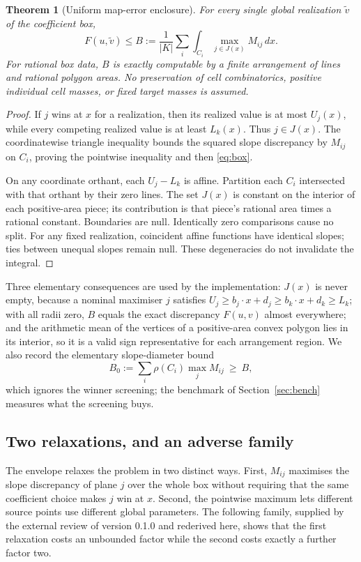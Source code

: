 \documentclass[11pt]{article}
\newtheorem{theorem}{Theorem}
\theoremstyle{remark}
\begin{document}
\begin{theorem}[Uniform map-error enclosure]\label{thm:box}
For every single global realization $\widetilde v$ of the coefficient box,
\begin{equation}\label{eq:box}
 F(u,\widetilde v)\leq
 B:=\frac1{|K|}\sum_i\int_{C_i}\max_{j\in J(x)}M_{ij}\,dx.
\end{equation}
For rational box data, $B$ is exactly computable by a finite arrangement of
lines and rational polygon areas. No preservation of cell combinatorics,
positive individual cell masses, or fixed target masses is assumed.
\end{theorem}
\begin{proof}
If $j$ wins at $x$ for a realization, then its realized value is at most
$U_j(x)$, while every competing realized value is at least $L_k(x)$.
Thus $j\in J(x)$. The coordinatewise triangle inequality bounds the
squared slope discrepancy by $M_{ij}$ on $C_i$, proving the pointwise
inequality and then \eqref{eq:box}.

On any coordinate orthant, each $U_j-L_k$ is affine. Partition each
$C_i$ intersected with that orthant by their zero lines. The set $J(x)$
is constant on the interior of each positive-area piece; its contribution
is that piece's rational area times a rational constant. Boundaries are
null. Identically zero comparisons cause no split. For any fixed
realization, coincident affine functions have identical slopes; ties
between unequal slopes remain null. These degeneracies do not invalidate
the integral.
\end{proof}

Three elementary consequences are used by the implementation: $J(x)$ is never
empty, because a nominal maximiser $j$ satisfies $U_j\ge b_j\cdot x+d_j\ge
b_k\cdot x+d_k\ge L_k$; with all radii zero, $B$ equals the exact discrepancy
$F(u,v)$ almost everywhere; and the arithmetic mean of the vertices of a
positive-area convex polygon lies in its interior, so it is a valid sign
representative for each arrangement region. We also record the elementary
slope-diameter bound
\begin{equation}\label{eq:baseline}
 B_0:=\sum_i\rho(C_i)\max_j M_{ij}\ \ge\ B,
\end{equation}
which ignores the winner screening; the benchmark of Section~\ref{sec:bench}
measures what the screening buys.

\subsection{Two relaxations, and an adverse family}
The envelope relaxes the problem in two distinct ways. First, $M_{ij}$
maximises the slope discrepancy of plane $j$ over the whole box without
requiring that the same coefficient choice makes $j$ win at $x$. Second, the
pointwise maximum lets different source points use different global
parameters. The following family, supplied by the external review of version
0.1.0 and rederived here, shows that the first relaxation costs an unbounded
factor while the second costs exactly a further factor two.
\end{document}

